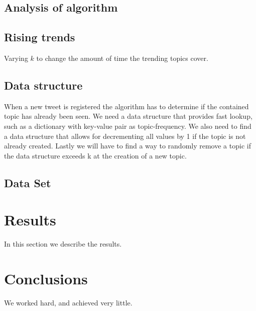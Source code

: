 \documentclass[12pt]{article}
\begin{document}
\subsection{Analysis of algorithm}

\subsection{Rising trends}
Varying $k$ to change the amount of time the trending topics cover.

\subsection{Data structure}
When a new tweet is registered the algorithm has to determine if the contained topic has already been seen. We need a data structure that provides fast lookup, such as a dictionary with key-value pair as topic-frequency. We also need to find a data structure that allows for decrementing all values by 1 if the topic is not already created. Lastly we will have to find a way to randomly remove a topic if the data structure exceeds k at the creation of a new topic.

\subsection{Data Set}

\section{Results}\label{results}
In this section we describe the results.

\section{Conclusions}\label{conclusions}
We worked hard, and achieved very little.



\end{document}
